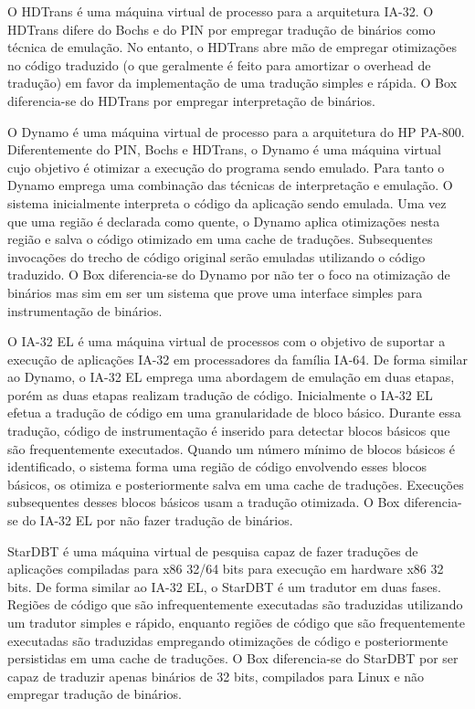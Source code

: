 \documentclass[11pt,twoside]{article}
\begin{document}
O HDTrans \cite{Sridhar2006} é uma máquina virtual de processo para a arquitetura IA-32.
O HDTrans difere do Bochs e do PIN por empregar tradução de binários como técnica de emulação.
No entanto, o HDTrans abre mão de empregar otimizações no código traduzido (o que geralmente é feito para amortizar o overhead de tradução) em favor da implementação de uma tradução simples e rápida.
O Box diferencia-se do HDTrans por empregar interpretação de binários.

O Dynamo \cite{Bala2000} é uma máquina virtual de processo para a arquitetura do HP PA-800. 
Diferentemente do PIN, Bochs e HDTrans, o Dynamo é uma máquina virtual cujo objetivo é otimizar a execução do programa sendo emulado.
Para tanto o Dynamo emprega uma combinação das técnicas de interpretação e emulação. 
O sistema inicialmente interpreta o código da aplicação sendo emulada. 
Uma vez que uma região é declarada como quente, o Dynamo aplica otimizações nesta região e salva o código otimizado em uma cache de traduções. 
Subsequentes invocações do trecho de código original serão emuladas utilizando o código traduzido. 
O Box diferencia-se do Dynamo por não ter o foco na otimização de binários mas sim em ser um sistema que prove uma interface simples para 
instrumentação de binários.

O IA-32 EL \cite{Baraz2003} é uma máquina virtual de processos com o objetivo de suportar a execução de aplicações IA-32 em processadores da família IA-64.
De forma similar ao Dynamo, o IA-32 EL emprega uma abordagem de emulação em duas etapas, porém as duas etapas realizam tradução de código. 
Inicialmente o IA-32 EL efetua a tradução de código em uma granularidade de bloco básico.
Durante essa tradução, código de instrumentação é inserido para detectar blocos básicos que são frequentemente executados. 
Quando um número mínimo de blocos básicos é identificado, o sistema forma uma região de código envolvendo esses blocos básicos, os otimiza e posteriormente salva em uma cache de traduções. 
Execuções subsequentes desses blocos básicos usam a tradução otimizada. 
O Box diferencia-se do IA-32 EL por não fazer tradução de binários.

StarDBT \cite{Wang2007} é uma máquina virtual de pesquisa capaz de fazer traduções de aplicações compiladas para x86 32/64 bits para execução em hardware x86 32 bits.
De forma similar ao IA-32 EL, o StarDBT é um tradutor em duas fases. 
Regiões de código que são infrequentemente executadas são traduzidas utilizando um tradutor simples e rápido, enquanto regiões de código que são frequentemente executadas são traduzidas empregando otimizações de código e posteriormente persistidas em uma cache de traduções. 
O Box diferencia-se do StarDBT por ser capaz de traduzir apenas binários de 32 bits, compilados para Linux e não empregar tradução de binários.
\end{document}
